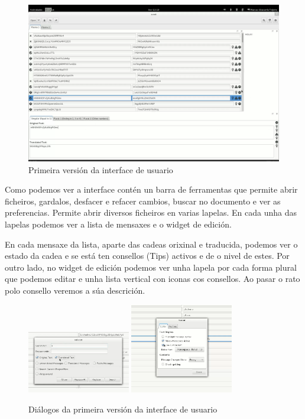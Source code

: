 \begin{figure}[h!]
  \centering
    \includegraphics[width=\textwidth]{img/gsoc1_it2_ui.png}
    \caption{Primeira versión da interface de usuario}
    \label{fig:ui:v1:general}
\end{figure}

Como podemos ver a interface contén un barra de ferramentas que permite abrir ficheiros, gardalos, desfacer e refacer cambios, buscar no documento e ver as preferencias. Permite abrir diversos ficheiros en varias lapelas. En cada unha das lapelas podemos ver a lista de mensaxes e o widget de edición.

En cada mensaxe da lista, aparte das cadeas orixinal e traducida, podemos ver o estado da cadea e se está ten consellos (Tips) activos e de o nivel de estes. Por outro lado, no widget de edición podemos ver unha lapela por cada forma plural que podemos editar e unha lista vertical con iconas cos consellos. Ao pasar o rato polo consello veremos a súa descrición.

\begin{figure}[h!]
  \centering
  \includegraphics[width=0.4\textwidth]{img/gsoc1_it3_ui.png}
  \includegraphics[width=0.4\textwidth]{img/gsoc1_it5_prefs.png}
  \caption{Diálogos da primeira versión da interface de usuario}
  \label{fig:ui:v1:dialogs}
\end{figure}

